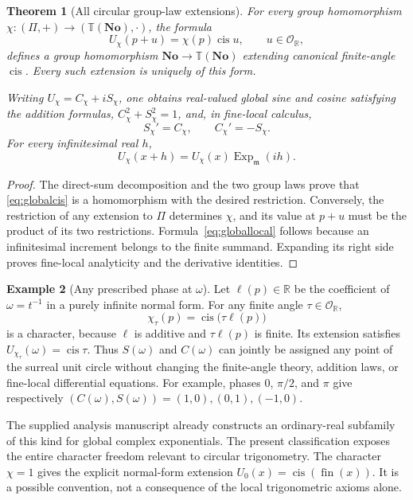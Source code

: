 \documentclass[11pt]{article}
\numberwithin{equation}{section}
\newtheorem{theorem}{Theorem}[section]
\theoremstyle{definition}
\newtheorem{example}[theorem]{Example}
\newcommand{\No}{\mathbf{No}}
\newcommand{\R}{\mathbb R}
\newcommand{\OO}{\mathcal O}
\newcommand{\mm}{\mathfrak m}
\newcommand{\TT}{\mathbb T}
\newcommand{\cis}{\operatorname{cis}}
\newcommand{\Ex}{\operatorname{Exp}_{\mm}}
\newcommand{\fin}{\operatorname{fin}}
\begin{document}
\begin{theorem}[All circular group-law extensions]\label{thm:characters}
For every group homomorphism $\chi:(\Pi,+)\to(\TT(\No),\cdot)$, the formula
\begin{equation}\label{eq:globalcis}
 U_\chi(p+u)=\chi(p)\cis u,\qquad u\in\OO_{\R},
\end{equation}
defines a group homomorphism $\No\to\TT(\No)$ extending canonical finite-angle $\cis$. Every such extension is uniquely of this form.

Writing $U_\chi=C_\chi+iS_\chi$, one obtains real-valued global sine and cosine satisfying the addition formulas, $C_\chi^2+S_\chi^2=1$, and, in fine-local calculus,
\[
 S_\chi'=C_\chi,\qquad C_\chi'=-S_\chi.
\]
For every infinitesimal real $h$,
\begin{equation}\label{eq:globallocal}
 U_\chi(x+h)=U_\chi(x)\Ex(ih).
\end{equation}
\end{theorem}
\begin{proof}
The direct-sum decomposition and the two group laws prove that \eqref{eq:globalcis} is a homomorphism with the desired restriction. Conversely, the restriction of any extension to $\Pi$ determines $\chi$, and its value at $p+u$ must be the product of its two restrictions. Formula~\eqref{eq:globallocal} follows because an infinitesimal increment belongs to the finite summand. Expanding its right side proves fine-local analyticity and the derivative identities.
\end{proof}

\begin{example}[Any prescribed phase at $\omega$]\label{ex:phases}
Let $\ell(p)\in\R$ be the coefficient of $\omega=t^{-1}$ in a purely infinite normal form. For any finite angle $\tau\in\OO_{\R}$,
\[
 \chi_\tau(p)=\cis\bigl(\tau\ell(p)\bigr)
\]
is a character, because $\ell$ is additive and $\tau\ell(p)$ is finite. Its extension satisfies $U_{\chi_\tau}(\omega)=\cis\tau$. Thus $S(\omega)$ and $C(\omega)$ can jointly be assigned any point of the surreal unit circle without changing the finite-angle theory, addition laws, or fine-local differential equations. For example, phases $0$, $\pi/2$, and $\pi$ give respectively $(C(\omega),S(\omega))=(1,0),(0,1),(-1,0)$.
\end{example}
The supplied analysis manuscript already constructs an ordinary-real subfamily of this kind for global complex exponentials. The present classification exposes the entire character freedom relevant to circular trigonometry. The character $\chi=1$ gives the explicit normal-form extension $U_0(x)=\cis(\fin(x))$. It is a possible convention, not a consequence of the local trigonometric axioms alone.
\end{document}
